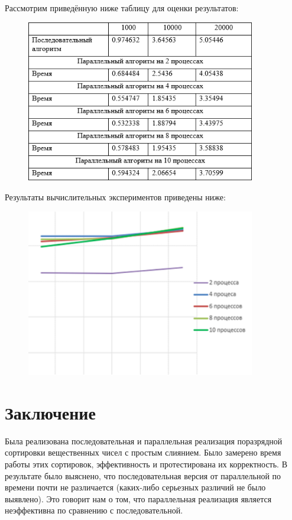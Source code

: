 \documentclass{report}
\begin{document}
\par Рассмотрим приведённую ниже таблицу для оценки результатов:
\\


\begin{figure}[htp]
    \centering
    \includegraphics[width=10cm]{tt}
    \label{fig:galaxy}
\end{figure}


\par Результаты вычислительных экспериментов приведены ниже:

\begin{figure}[htp]
    \centering
    \includegraphics[width=10cm]{image11}
    \label{fig:galaxy}
\end{figure}

\newpage

\section*{Заключение}
\par Была реализована последовательная и параллельная реализация поразрядной сортировки вещественных чисел с простым слиянием. Было замерено время работы этих сортировок, эффективность и протестирована их корректность. В результате было выяснено, что последовательная версия от параллельной по времени почти не различается (каких-либо серьезных различий не было выявлено). Это говорит нам о том, что параллельная реализация является неэффективна по сравнению с последовательной.
\end{document}
